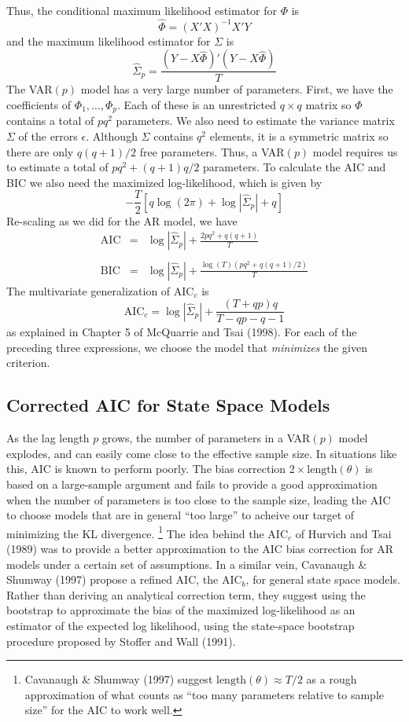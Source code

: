 Thus, the conditional maximum likelihood estimator for $\Phi$ is
	$$\widehat{\Phi} = (X'X)^{-1} X'Y$$
and the maximum likelihood estimator for $\Sigma$ is
	$$\widehat{\Sigma}_p = \frac{\left(Y - X\widehat{\Phi}\right)'\left(Y - X\widehat{\Phi}\right)}{T}$$
The VAR$(p)$ model has a very large number of parameters. First, we have the coefficients of $\Phi_1, \hdots, \Phi_p$. Each of these is an unrestricted $q\times q$ matrix so $\Phi$ contains a total of $pq^2$ parameters. We also need to estimate the variance matrix $\Sigma$ of the errors $\epsilon$. Although $\Sigma$ contains $q^2$ elements, it is a symmetric matrix so there are only $q(q+1)/2$ free parameters. Thus, a VAR$(p)$ model requires us to estimate a total of $pq^2 + (q+1)q/2$ parameters. To calculate the AIC and BIC we also need the maximized log-likelihood, which is given by
	$$-\frac{T}{2} \left[q\log(2\pi) + \log \left| \widehat{\Sigma}_p\right| + q\right]$$
Re-scaling as we did for the AR model, we have
\begin{eqnarray*}
	\mbox{AIC} &=& \log \left| \widehat{\Sigma}_p\right| + \frac{2pq^2 + q(q+1)}{T}\\ \\
	\mbox{BIC} &=& \log \left| \widehat{\Sigma}_p\right| +  \frac{\log(T)(pq^2 + q(q+1)/2)}{T}
\end{eqnarray*}
The multivariate generalization of AIC$_c$ is
$$\mbox{AIC}_c = \log \left| \widehat{\Sigma}_p\right|  + \frac{(T + qp)q}{T - qp - q -1}$$
as explained in Chapter 5 of McQuarrie and Tsai (1998). For each of the preceding three expressions, we choose the model that \emph{minimizes} the given criterion.

\subsection{Corrected AIC for State Space Models}
As the lag length $p$ grows, the number of parameters in a VAR$(p)$ model explodes, and can easily come close to the effective sample size. 
In situations like this, AIC is known to perform poorly. 
The bias correction $2\times \mbox{length}(\theta)$ is based on a large-sample argument and fails to provide a good approximation when the number of parameters is too close to the sample size, leading the AIC to choose models that are in general ``too large'' to acheive our target of minimizing the KL divergence.
\footnote{Cavanaugh \& Shumway (1997) suggest $\mbox{length}(\theta) \approx T/2$ as a rough approximation of what counts as ``too many parameters relative to sample size'' for the AIC to work well.} 
The idea behind the AIC$_c$ of Hurvich and Tsai (1989) was to provide a better approximation to the AIC bias correction for AR models under a certain set of assumptions. 
In a similar vein, Cavanaugh \& Shumway (1997) propose a refined AIC, the AIC$_b$, for general state space models. 
Rather than deriving an analytical correction term, they suggest using the bootstrap to approximate the bias of the maximized log-likelihood as an estimator of the expected log likelihood, using the state-space bootstrap procedure proposed by Stoffer and Wall (1991).  

